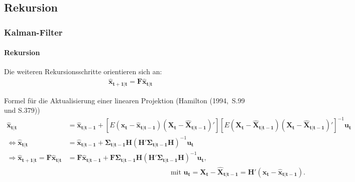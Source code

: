 \documentclass{beamer} %
\begin{document}
\subsection{Rekursion}
\begin{frame}\frametitle{Kalman-Filter}\framesubtitle{Rekursion}
Die weiteren Rekursionsschritte orientieren sich an:
\begin{align*} \mathbf{\widehat{x}_{t+1|t}} = \mathbf{F} \mathbf{\widehat{x}_{t|t}} \end{align*}
\begin{block}{\scriptsize Formel f\"{u}r die Aktualisierung einer linearen Projektion (Hamilton (1994,~S.99 und S.379))}
\scriptsize\begin{align*}
  \mathbf{\widehat{x}_{t|t}} &= \mathbf{\widehat{x}_{t|t-1}}  +\left[E(\mathbf{x_t}-\mathbf{\widehat{x}_{t|t-1}})(\mathbf{X_t}-\mathbf{\widehat{X}_{t|t-1}})'\right] \left[E(\mathbf{X_t}-\mathbf{\widehat{X}_{t|t-1}})(\mathbf{X_t}-\mathbf{\widehat{X}_{t|t-1}})'\right]^{-1} \mathbf{u_t}\\
 \Leftrightarrow \mathbf{\widehat{x}_{t|t}}&= \mathbf{\widehat{x}_{t|t-1}}+ \boldsymbol{\Sigma_{t|t-1}} \mathbf{H} \left(\mathbf{H}'\boldsymbol{\Sigma_{t|t-1}}\mathbf{H}\right)^{-1} \mathbf{u_t}\\
  \Rightarrow \mathbf{\widehat{x}_{t+1|t}} = \mathbf{F} \mathbf{\widehat{x}_{t|t}} &=\mathbf{F} \mathbf{\widehat{x}_{t|t-1}}+ \mathbf{F}\boldsymbol{\Sigma_{t|t-1}} \mathbf{H} \left(\mathbf{H}'\boldsymbol{\Sigma_{t|t-1}}\mathbf{H}\right)^{-1} \mathbf{u_t}, \\
  &\qquad\qquad\qquad\qquad\qquad\qquad\qquad~~~ \text{mit } \mathbf{u_t} = \mathbf{X_t} - \mathbf{\widehat{X}_{t|t-1}} = \mathbf{H'} (\mathbf{x_t} - \mathbf{\widehat{x}_{t|t-1}}).
\end{align*}
\end{block}
\end{frame}
\end{document}
